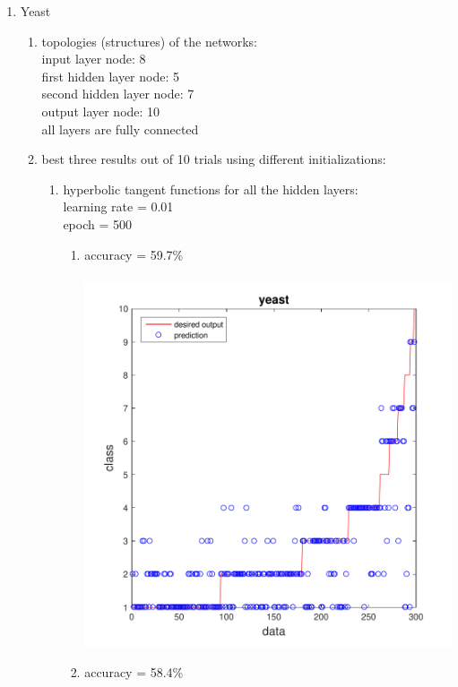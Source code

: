 \documentclass[12pt,a4paper]{article}
\begin{document}
\begin{CJK}{UTF8}{bsmi}
\begin{enumerate}
\begin{enumerate}
\end{enumerate}
\newpage
\item Yeast
\begin{enumerate}
	\item topologies (structures) of the networks: \\
	input layer node: 8 \\
	first hidden layer node: 5 \\
	second hidden layer node: 7 \\
	output layer node: 10\\
	all layers are fully connected
	\item best three results out of 10 trials using different initializations:
	\begin{enumerate}
		\item hyperbolic tangent functions for all the hidden layers:
		\\
		learning rate = 0.01 \\
		epoch = 500
		\begin{enumerate}
			\item accuracy = 59.7\%\\\
			\includegraphics[scale=0.6]{yeasthh1}
			\newpage	
			\item accuracy = 58.4\%\\\

\end{enumerate}
\end{enumerate}
\end{enumerate}
\end{enumerate}
\end{CJK}
\end{document}
